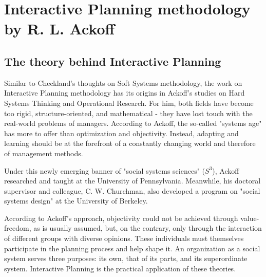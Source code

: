 \documentclass[a4paper,12pt]{scrartcl}
\begin{document}
\clearpage

\section{Interactive Planning methodology by R. L. Ackoff}

\subsection{The theory behind Interactive Planning}

Similar to Checkland's thoughts on Soft Systems methodology, the work on Interactive Planning methodology has its origins in Ackoff's studies on Hard Systems Thinking and Operational Research. For him, both fields have become too rigid, structure-oriented, and mathematical - they  have lost touch with the real-world problems of managers. According to Ackoff, the so-called "systems age" has more to offer than optimization and objectivity. Instead, adapting and learning should be at the forefront of a constantly changing world and therefore of management methods.\cite{ackoff:1981}

Under this newly emerging banner of "social systems sciences" ($S^3$), Ackoff researched and taught at the University of Pennsylvania.
Meanwhile, his doctoral supervisor and colleague, C. W. Churchman, also developed a program on "social systems design" at the University of Berkeley.\cite{jackson:1991}

According to Ackoff's approach, objectivity could not be achieved through value-freedom, as is usually assumed, but, on the contrary, only through the interaction of different groups with diverse opinions. These individuals must themselves participate in the planning process and help shape it. An organization as a social system serves three purposes: its own, that of its parts, and its superordinate system. Interactive Planning is the practical application of these theories.\cite{jackson:2003}
\end{document}
